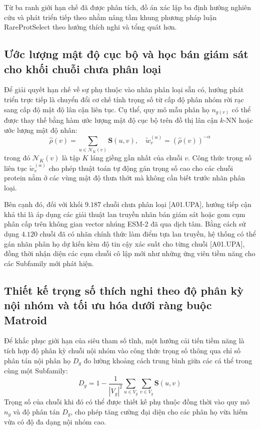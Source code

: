 Từ ba ranh giới hạn chế đã được phân tích, đồ án xác lập ba định hướng nghiên cứu và phát triển tiếp theo nhằm nâng tầm khung phương pháp luận RareProtSelect theo hướng thích nghi và tổng quát hơn.

\subsection{Ước lượng mật độ cục bộ và học bán giám sát cho khối chuỗi chưa phân loại}
\label{subsec:fut_upa_semisupervised}

Để giải quyết hạn chế về sự phụ thuộc vào nhãn phân loại sẵn có, hướng phát triển trực tiếp là chuyển đổi cơ chế tính trọng số từ cấp độ phân nhóm rời rạc sang cấp độ mật độ lân cận liên tục. Cụ thể, quy mô mẫu phân họ $n_{g(v)}$ có thể được thay thế bằng hàm ước lượng mật độ cục bộ trên đồ thị lân cận $k$-NN hoặc ước lượng mật độ nhân:
\begin{equation}
    \hat{\rho}(v) = \sum_{u \in \mathcal{N}_K(v)} \mathbf{S}(u, v), \quad \tilde{w}_v^{(\alpha)} = \left(\hat{\rho}(v)\right)^{-\alpha}
    \label{eq:fut_density_weight}
\end{equation}
trong đó $\mathcal{N}_K(v)$ là tập $K$ láng giềng gần nhất của chuỗi $v$. Công thức trọng số liên tục $\tilde{w}_v^{(\alpha)}$ cho phép thuật toán tự động gán trọng số cao cho các chuỗi protein nằm ở các vùng mật độ thưa thớt mà không cần biết trước nhãn phân loại.

Bên cạnh đó, đối với khối $9.187$ chuỗi chưa phân loại [A01.UPA], hướng tiếp cận khả thi là áp dụng các giải thuật lan truyền nhãn bán giám sát hoặc gom cụm phân cấp trên không gian vector nhúng ESM-2 đã qua dịch tâm. Bằng cách sử dụng $4.120$ chuỗi đã có nhãn chính thức làm điểm tựa lan truyền, hệ thống có thể gán nhãn phân họ dự kiến kèm độ tin cậy xác suất cho từng chuỗi [A01.UPA], đồng thời nhận diện các cụm chuỗi cô lập mới như những ứng viên tiềm năng cho các Subfamily mới phát hiện.

\subsection{Thiết kế trọng số thích nghi theo độ phân kỳ nội nhóm và tối ưu hóa dưới ràng buộc Matroid}
\label{subsec:fut_adaptive_matroid}

Để khắc phục giới hạn của siêu tham số tĩnh, một hướng cải tiến tiềm năng là tích hợp độ phân kỳ chuỗi nội nhóm vào công thức trọng số thông qua chỉ số phân tán nội phân họ $D_g$ đo lường khoảng cách trung bình giữa các cá thể trong cùng một Subfamily:
\begin{equation}
    D_g = 1 - \frac{1}{|V_g|^2} \sum_{u \in V_g} \sum_{v \in V_g} \mathbf{S}(u, v)
    \label{eq:fut_dispersion}
\end{equation}
Trọng số của chuỗi khi đó có thể được thiết kế phụ thuộc đồng thời vào quy mô $n_g$ và độ phân tán $D_g$, cho phép tăng cường đại diện cho các phân họ vừa hiếm vừa có độ đa dạng nội nhóm cao.

